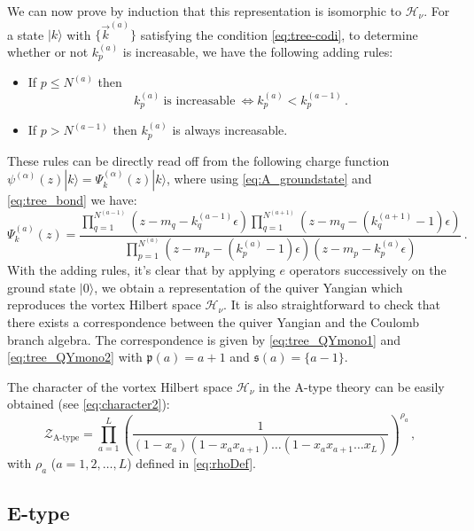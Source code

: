 \documentclass[12pt,a4paper]{article}
\renewcommand{\(}{\left(}
\renewcommand{\)}{\right)}
\renewcommand{\(}{\left(}
\renewcommand{\)}{\right)}
\begin{document}
We can now prove by induction that this representation is isomorphic to $\mathcal{H}_\nu$. 
For a state $|k\rangle$ with $\{\vec{k}^{(a)}\}$ satisfying the condition \eqref{eq:tree-codi}, to determine whether or not $k^{(a)}_{p}$ is increasable, we have the following adding rules:
\begin{itemize}
\item If $p\leq N^{(a)}$ then
\begin{equation}
k^{(a)}_p \ \text{is increasable}  \ \Longleftrightarrow k^{(a)}_{p}<k^{(a-1)}_{p}\,.
\end{equation}
		
\item If $p> N^{(a-1)}$ then $k^{(a)}_{p}$ is always increasable.
\end{itemize}
These rules can be directly read off from the following charge function $\psi^{(\alpha)}(z)|k\rangle=\Psi^{(\alpha)}_{k}(z) |k\rangle$, where using \eqref{eq:A_groundstate} and \eqref{eq:tree_bond} we have:
\begin{equation}
\Psi^{(a)}_{k}(z)=\frac{\prod_{q=1}^{N^{(a-1)}}(z-m_q-k^{(a-1)}_{q}\epsilon)\prod_{q=1}^{N^{(a+1)}}(z-m_q-(k^{(a+1)}_{q}-1)\epsilon)}{\prod_{p=1}^{N^{(a)}}(z-m_{p}-(k^{(a)}_{p}-1)\epsilon)(z-m_{p}-k^{(a)}_{p}\epsilon)}\,.
\end{equation}
With the adding rules, it's clear that by applying $e$ operators successively on the ground state $|0\rangle$, we obtain a representation of the quiver Yangian which reproduces the vortex Hilbert space $\mathcal{H}_\nu$. 
It is also straightforward to check that there exists a correspondence between the quiver Yangian and the Coulomb branch algebra. 
The correspondence is given by \eqref{eq:tree_QYmono1} and \eqref{eq:tree_QYmono2} with $\mathfrak{p}(a)=a+1$ and $\mathfrak{s}(a)=\{a-1\}$.

The character of the vortex Hilbert space $\mathcal{H}_\nu$ in the A-type theory can be easily obtained (see \eqref{eq:character2}):
\begin{equation}
\mathcal{Z}_{\textrm{A-type}} =\prod_{a=1}^L\left(\frac{1}{(1-x_a)(1-x_a x_{a+1})\dots(1-x_a x_{a+1}\dots x_L)}\right)^{\rho_a}\,,
\end{equation}
with $\rho_a$ ($a=1,2,\dots,L$) defined in \eqref{eq:rhoDef}.




\subsection{E-type}\label{appssec:Etype}
\end{document}
